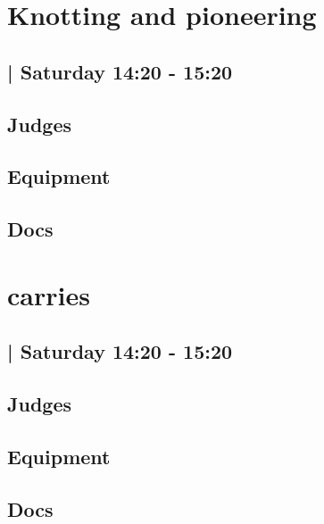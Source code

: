 \documentclass[10pt]{article}
\begin{document}
		\begin{minipage}{\linewidth}
		\setcounter{section}{42}
	\section{Knotting and pioneering }
	\subsection*{ | Saturday 14:20 - 15:20}

	

	\begin{multicols}{2}
	\subsection*{\faUsers \: Judges}
	\begin{itemize}
		\end{itemize}
	\columnbreak
	\subsection*{\faWrench \: Equipment}
	        \vfill\null
        \subsection*{\faFile \: Docs}
     	\end{multicols}


	\vspace{1cm}
	\end{minipage}

		\begin{minipage}{\linewidth}
		\setcounter{section}{43}
	\section{carries }
	\subsection*{ | Saturday 14:20 - 15:20}

	

	\begin{multicols}{2}
	\subsection*{\faUsers \: Judges}
	\begin{itemize}
		\end{itemize}
	\columnbreak
	\subsection*{\faWrench \: Equipment}
	        \vfill\null
        \subsection*{\faFile \: Docs}
     	\end{multicols}


	\vspace{1cm}
	\end{minipage}
\end{document}

